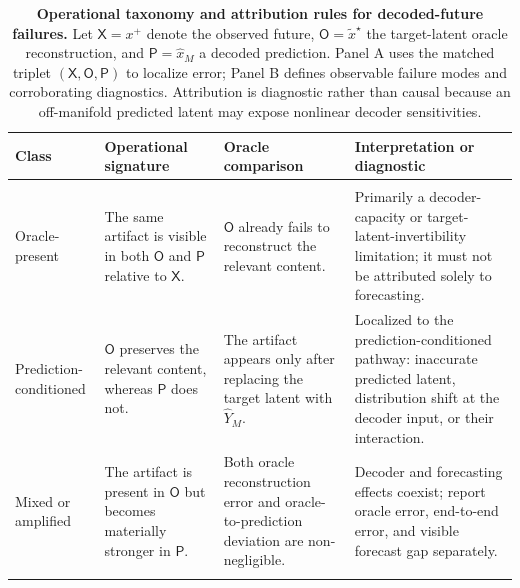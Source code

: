 \begin{table}[ht!]
\centering
\caption{
\textbf{Operational taxonomy and attribution rules for decoded-future
failures.}
Let \(\mathsf{X}=x^{+}\) denote the observed future,
\(\mathsf{O}=\widetilde x^{\star}\) the target-latent oracle
reconstruction, and \(\mathsf{P}=\widehat x_M\) a decoded prediction.
Panel A uses the matched triplet
\((\mathsf{X},\mathsf{O},\mathsf{P})\) to localize error; Panel B
defines observable failure modes and corroborating diagnostics.
Attribution is diagnostic rather than causal because an off-manifold
predicted latent may expose nonlinear decoder sensitivities.
}
\label{tab:rgb_failure_taxonomy}
\scriptsize
\setlength{\tabcolsep}{4.5pt}
\renewcommand{\arraystretch}{1.15}

\begin{tabularx}{\textwidth}{
    p{}
    p{}
    p{}
    >{\raggedright\arraybackslash}X
}
\toprule
\textbf{Class}
&
\textbf{Operational signature}
&
\textbf{Oracle comparison}
&
\textbf{Interpretation or diagnostic}
\\
\midrule

\rowcolor{DecoderBlue}
\multicolumn{4}{l}{
\textbf{Panel A: Oracle-based attribution rules}
}
\\
\midrule

Oracle-present
&
The same artifact is visible in both
\(\mathsf{O}\) and \(\mathsf{P}\) relative to \(\mathsf{X}\).
&
\(\mathsf{O}\) already fails to reconstruct the relevant content.
&
Primarily a decoder-capacity or target-latent-invertibility limitation;
it must not be attributed solely to forecasting.
\\

Prediction-conditioned
&
\(\mathsf{O}\) preserves the relevant content, whereas
\(\mathsf{P}\) does not.
&
The artifact appears only after replacing the target latent with
\(\widehat Y_M\).
&
Localized to the prediction-conditioned pathway: inaccurate predicted
latent, distribution shift at the decoder input, or their interaction.
\\

Mixed or amplified
&
The artifact is present in \(\mathsf{O}\) but becomes materially
stronger in \(\mathsf{P}\).
&
Both oracle reconstruction error and oracle-to-prediction deviation
are non-negligible.
&
Decoder and forecasting effects coexist; report oracle error,
end-to-end error, and visible forecast gap separately.
\\

\midrule
\rowcolor{DecoderGold}
\multicolumn{4}{l}{
\textbf{Panel B: Observable decoded-future failure modes}
}
\\
\midrule


\end{tabularx}
\end{table}
